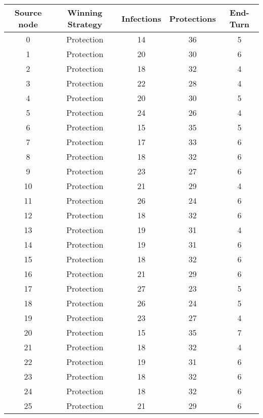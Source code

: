 \documentclass[results.tex]{subfiles}
\begin{document}
\begin{center}
  \begin{tabular}{| c || c | c | c | c |}
    \hline
    {\bfseries Source node} & {\bfseries Winning Strategy} & {\bfseries Infections} & {\bfseries Protections} & {\bfseries End-Turn} \\  %
    \hline\hline
    0 & Protection & 14 & 36 & 5 \\ 
    \hline
    1 & Protection & 20 & 30 & 6 \\ 
    \hline
    2 & Protection & 18 & 32 & 4 \\ 
    \hline
    3 & Protection & 22 & 28 & 4 \\ 
    \hline
    4 & Protection & 20 & 30 & 5 \\ 
    \hline
    5 & Protection & 24 & 26 & 4 \\ 
    \hline
    6 & Protection & 15 & 35 & 5 \\ 
    \hline
    7 & Protection & 17 & 33 & 6 \\ 
    \hline
    8 & Protection & 18 & 32 & 6 \\ 
    \hline
    9 & Protection & 23 & 27 & 6 \\ 
    \hline
    10 & Protection & 21 & 29 & 4 \\ 
    \hline
    11 & Protection & 26 & 24 & 6 \\ 
    \hline
    12 & Protection & 18 & 32 & 6 \\ 
    \hline
    13 & Protection & 19 & 31 & 4 \\ 
    \hline
    14 & Protection & 19 & 31 & 6 \\ 
    \hline
    15 & Protection & 18 & 32 & 6 \\ 
    \hline
    16 & Protection & 21 & 29 & 6 \\ 
    \hline
    17 & Protection & 27 & 23 & 5 \\ 
    \hline
    18 & Protection & 26 & 24 & 5 \\ 
    \hline
    19 & Protection & 23 & 27 & 4 \\ 
    \hline
    20 & Protection & 15 & 35 & 7 \\ 
    \hline
    21 & Protection & 18 & 32 & 4 \\ 
    \hline
    22 & Protection & 19 & 31 & 6 \\ 
    \hline
    23 & Protection & 18 & 32 & 6 \\ 
    \hline
    24 & Protection & 18 & 32 & 6 \\ 
    \hline
    25 & Protection & 21 & 29 & 6 \\ 

\end{tabular}
\end{center}
\end{document}
